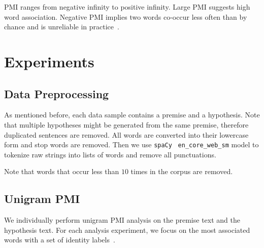 \documentclass[11pt]{article}
\begin{document}
    PMI ranges from negative infinity to positive infinity.
    Large PMI suggests high word association.
    Negative PMI implies two words co-occur less often than by chance and is unreliable in
    practice~\cite{speech_and_nlp_book}.


    \section{Experiments}

    \subsection{Data Preprocessing}

    As mentioned before, each data sample contains a premise and a hypothesis.
    Note that multiple hypotheses might be generated from the same premise, therefore duplicated sentences are
    removed.
    All words are converted into their lowercase form and stop words are removed.
    Then we use \texttt{spaCy}~\cite{spacy} \texttt{en\_core\_web\_sm} model to tokenize raw strings into
    lists of words and remove all punctuations.

    Note that words that occur less than $10$ times in the corpus are removed.

    \subsection{Unigram PMI}

    We individually perform unigram PMI analysis on the premise text and the hypothesis text.
    For each analysis experiment, we focus on the most associated words with a set of
    identity labels~\cite{identity_labels}.
\end{document}

